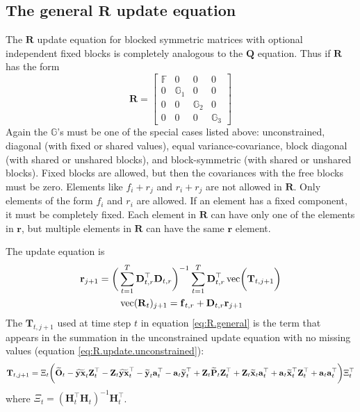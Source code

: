 \documentclass[]{article}
\def\XI{\mbox{\boldmath $\Xi$}}
\def\DD{\mbox{$\mathbf D$}}	\def\dd{\mbox{$\mathbf d$}}
\def\HH{\mbox{$\mathbf H$}}	\def\hh{\mbox{$\mathbf h$}}
\def\OO{\mbox{$\mathbf O$}}
\def\PP{\mbox{$\mathbf P$}}  \def\pp{\mbox{$\mathbf p$}}
\def\QQ{\mbox{$\mathbf Q$}}	 \def\qq{\mbox{$\mathbf q$}} \def\Qb{\mbox{$\mathbf G$}}  \def\Qm{\mathbb{Q}}
\def\RR{\mbox{$\mathbf R$}}	 \def\rr{\mbox{$\mathbf r$}} \def\Rb{\mbox{$\mathbf H$}}	\def\Rm{\mathbb{R}}
\def\TT{\mbox{$\mathbf T$}}
\def\ZZ{\mbox{$\mathbf Z$}}	\def\zz{\mbox{$\mathbf z$}}	\def\Zb{\mbox{$\mathbf M$}} \def\Za{\mbox{$\mathbf N$}} \def\Zm{\XI}
\def\vec{\,\textup{\textrm{vec}}}
\def\hatxt{\widetilde{\mbox{$\mathbf x$}}_t}
\def\hatyt{\widetilde{\mbox{$\mathbf y$}}_t}
\def\hatOt{\widetilde{\OO}_t}
\def\hatYXt{\widetilde{\mbox{$\mathbf{y}\mathbf{x}$}}_t}
\def\hatPt{\widetilde{\PP}_t}
\begin{document}
\subsection{The general $\RR$ update equation}
The $\RR$ update equation for blocked symmetric matrices with optional independent fixed blocks is completely analogous to the $\QQ$ equation.  Thus if $\RR$ has the form
\begin{equation*}
\RR=
\begin{bmatrix}
\mathbb{F}&0&0&0\\
0&\mathbb{G}_1&0&0\\
0&0&\mathbb{G}_2&0\\
0&0&0&\mathbb{G}_3
\end{bmatrix}
\end{equation*}
Again the $\mathbb{G}$'s must be one of the special cases listed above: unconstrained, diagonal (with fixed or shared values), equal variance-covariance, block diagonal (with shared or unshared blocks), and block-symmetric (with shared or unshared blocks).  Fixed blocks are allowed, but then the covariances with the free blocks must be zero.  Elements like $f_i+r_j$ and $r_i+r_j$ are not allowed in $\RR$. Only elements of the form $f_i$ and $r_i$ are allowed.  If an element has a fixed component, it must be completely fixed.  Each element in $\RR$ can have only one of the elements in $\rr$, but multiple elements in $\RR$ can have the same $\rr$ element.

The update equation is
\begin{equation}\label{eq:R.general}
\begin{split}
&\rr_{j+1}  =   
\bigg(\sum_{t=1}^T\DD_{t,r}^\top \DD_{t,r}\bigg)^{-1} \sum_{t=1}^T \DD_{t,r}^\top\vec\bigg(\TT_{t,{j+1}}  
 \bigg)\\
&\quad\quad\quad\quad\vec(\RR_t)_{j+1} = \ff_{t,r} + \DD_{t,r} \rr_{j+1}
\end{split}
\end{equation}
The $\TT_{t,j+1}$ used at time step $t$ in equation \ref{eq:R.general} is the term that appears in the summation in the unconstrained update equation with no missing values (equation \ref{eq:R.update.unconstrained}):
\begin{equation}
\begin{split}
\TT_{t,j+1}=\Xi_t\bigg(  
 \hatOt - \hatYXt\ZZ_t^\top - \ZZ_t\hatYXt^\top 
 - \hatyt\aa_t^\top - \aa_t\hatyt^\top 
 + \ZZ_t\hatPt\ZZ_t^\top + \ZZ_t\hatxt\aa_t^\top + \aa_t\hatxt^\top\ZZ_t^\top 
 + \aa_t\aa_t^\top \bigg)\Xi_t^\top
\end{split}
\end{equation}
where $\Xi_t = (\HH_t^\top\HH_t)^{-1}\HH_t^\top$.
\end{document}
